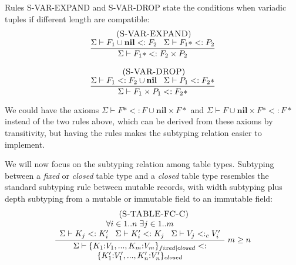 \documentclass{sigplanconf}
\newcommand{\Nil}{\mathbf{nil}}
\newcommand{\mylabel}[1]{\; (\textsc{#1})}
\newcommand{\senv}{\Sigma}
\newcommand{\subtype}{<:}
\begin{document}
Rules {\sc S-VAR-EXPAND} and {\sc S-VAR-DROP} state the
conditions when variadic tuples if different length are
compatible:
\[
\begin{array}{c}
\begin{array}{c}
\mylabel{S-VAR-EXPAND}\\
\dfrac{\senv \vdash F_{1} \cup \Nil \subtype F_{2} \;\;\;
       \senv \vdash F_{1}{*} \subtype P_{2}}
      {\senv \vdash F_{1}{*} \subtype F_{2} \times P_{2}}
\end{array}
\\ \\
\begin{array}{c}
\mylabel{S-VAR-DROP}\\
\dfrac{\senv \vdash F_{1} \subtype F_{2} \cup \Nil \;\;\;
       \senv \vdash P_{1} \subtype F_{2}{*}}
      {\senv \vdash F_{1} \times P_{1} \subtype F_{2}{*}}
\end{array}
\end{array}
\]

We could have the axioms $\senv \vdash F{*} \subtype F \cup \Nil \times F{*}$ and $\senv \vdash F \cup \Nil \times F{*}  \subtype F{*}$ instead of the two rules above, which can be derived
from these axioms by transitivity, but having the rules makes
the subtyping relation easier to implement.

We will now focus on the subtyping relation among table
types. Subtyping between a {\em fixed} or {\em closed}
table type and a {\em closed} table type resembles the
standard subtyping rule between mutable records, with
width subtyping plus depth subtyping from a mutable
or immutable field to an immutable field:
\[
\begin{array}{c}
\mylabel{S-TABLE-FC-C}\\
\dfrac{\begin{array}{c}
       \forall i \in 1..n \; \exists j \in 1..m \\
       \senv \vdash K_{j} \subtype K_{i}' \;\;\;
       \senv \vdash K_{i}' \subtype K_{j} \;\;\;
       \senv \vdash V_{j} \subtype_{c} V_{i}'
       \end{array}}
      {\begin{array}{c}
       \senv \vdash \{K_{1}{:}V_{1}, ..., K_{m}{:}V_{m}\}_{fixed|closed} \subtype\\
                    \{K_{1}'{:}V_{1}', ..., K_{n}'{:}V_{n}'\}_{closed}
       \end{array}} \; m \ge n
\end{array}
\]
\end{document}
